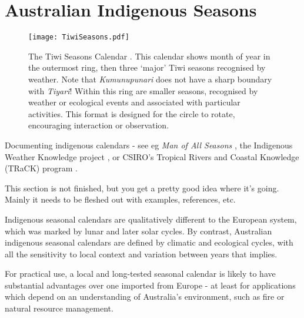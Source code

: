 \section{Australian Indigenous Seasons}
\label{sec:aus-indig-seasons}

\begin{sidewaysfigure}
    \centering
    \texttt{[image: TiwiSeasons.pdf]}
    \caption[The Tiwi Seasons Calendar \citep{CSIROcals}]{
        The Tiwi Seasons Calendar \citep{CSIROcals}.
        This calendar shows month of year in the outermost ring,
        then three `major' Tiwi seasons recognised by weather.
        Note that \textit{Kumunupunari} does not have a sharp boundary with \textit{Tiyari}!
        Within this ring are smaller seasons, recognised by weather
        or ecological events and associated with particular activities.
        This format is designed for the circle to rotate, encouraging interaction or observation.
        }
    \label{fig:tiwi-seasons}
\end{sidewaysfigure}








Documenting indigenous calendars - see eg \textit{Man of All Seasons} \citep{davis1989},
the Indigenous Weather Knowledge project \citet{BOM-iwk},
or CSIRO's Tropical Rivers and Coastal Knowledge (TRaCK) program \citep{CSIROcals,oconnor2010}.


This section is not finished, but you get a pretty good idea where it's
going.  Mainly it needs to be fleshed out with examples, references, etc.

Indigenous seasonal calendars are qualitatively different to the European
system, which was marked by lunar and later solar cycles.  By contrast,
Australian indigenous seasonal calendars are defined by climatic and ecological
cycles, with all the sensitivity to local context and variation between years
that implies.

For practical use, a local and long-tested seasonal calendar is likely to have
substantial advantages over one imported from Europe - at least for
applications which depend on an understanding of Australia's environment, such
as fire or natural resource management.

